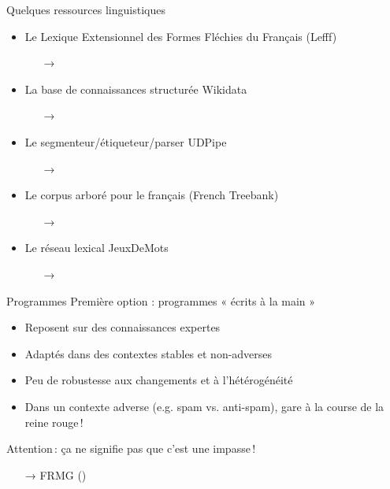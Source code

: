 \documentclass[hyperref={unicode}, xcolor={svgnames}]{beamer}
\begin{document}
\begin{frame}{Quelques ressources linguistiques}
    \begin{itemize}
        \item Le Lexique Extensionnel des Formes Fléchies du Français (Lefff)
            \begin{itemize}
                \item[→] 
            \end{itemize}
        \item La base de connaissances structurée Wikidata
            \begin{itemize}
                \item[→] 
            \end{itemize}
        \item Le segmenteur/étiqueteur/parser UDPipe
            \begin{itemize}
                \item[→] 
            \end{itemize}
        \item Le corpus arboré pour le français (French Treebank)
            \begin{itemize}
                \item[→] 
            \end{itemize}
        \item Le réseau lexical JeuxDeMots
            \begin{itemize}
                \item[→] 
            \end{itemize}
    \end{itemize}
\end{frame}

\begin{frame}{Programmes}
    Première option : programmes « écrits à la main »
    \begin{itemize}
        \item Reposent sur des connaissances expertes
        \item Adaptés dans des contextes stables et non-adverses
        \item Peu de robustesse aux changements et à l'hétérogénéité
        \item Dans un contexte adverse (e.g. spam vs. anti-spam), gare à la course de la reine rouge !
    \end{itemize}
    Attention : ça ne signifie pas que c'est une impasse !
    \begin{itemize}
        \item[→] FRMG ()
    \end{itemize}
\end{frame}
\end{document}
